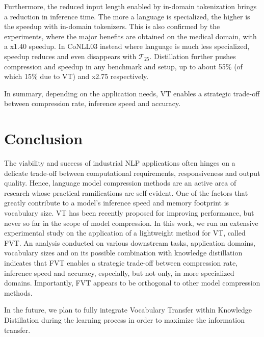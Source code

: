 \documentclass[11pt]{article}
\def\tok{\mathcal{T}}
\begin{document}
Furthermore, the reduced input length enabled by in-domain tokenization brings a reduction in inference time. The more a language is specialized, the higher is the speedup with in-domain tokenizers. This is also confirmed by the experiments, where the major benefits are obtained on the medical domain, with a x1.40 speedup. In CoNLL03 instead where language is much less specialized, speedup reduces and even disappears with $\tok_{25}$. 
Distillation further pushes compression and speedup in any benchmark and setup, up to about 55\% (of which 15\% due to VT) and x2.75 respectively. 

In summary, depending on the application needs, VT enables a strategic trade-off between compression rate, inference speed and accuracy.


\section{Conclusion}\label{sec:conclusions}
The viability and success of industrial NLP applications often hinges on a delicate trade-off between computational requirements, responsiveness and output quality. Hence, language model compression methods are an active area of research whose practical ramifications are self-evident.  One of the factors that greatly contribute to a model's inference speed and memory footprint is vocabulary size. VT has been recently proposed for improving performance, but never so far in the scope of model compression. In this work, we run an extensive experimental study on the application of a lightweight method for VT, called FVT. An analysis conducted on various downstream tasks, application domains, vocabulary sizes and on its possible combination with knowledge distillation indicates that FVT enables a strategic trade-off between compression rate, inference speed and accuracy, especially, but not only, in more specialized domains. Importantly, FVT appears to be orthogonal to other model compression methods.

In the future, we plan to fully integrate Vocabulary Transfer within Knowledge Distillation during the learning process in order to maximize the information transfer.




\end{document}

